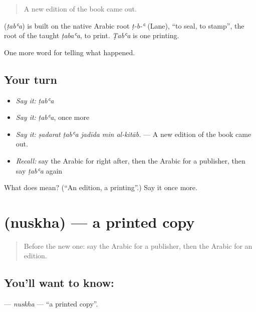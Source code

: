\begin{quote}
A new edition of the book came out.
\end{quote}

\begin{cousinweb}
\textbf{} (\emph{ṭabʿa}) is built on the native Arabic root \emph{ṭ-b-ʿ} (Lane), \textquotedblleft{}to seal, to stamp\textquotedblright{}, the root of the taught \emph{ṭabaʿa}, to print. \emph{Ṭabʿa} is one printing.
\end{cousinweb}

\begin{grammarlens}[title={What you've built}]
One more word for telling what happened.
\end{grammarlens}

\subsection*{Your turn}
\begin{itemize}
\raggedright
  \item \emph{Say it:} \emph{ṭabʿa}
  \item \emph{Say it:} \emph{ṭabʿa}, once more
  \item \emph{Say it:} \emph{ṣadarat ṭabʿa jadīda min al-kitāb.} — A new edition of the book came out.
  \item \emph{Recall:} say the Arabic for right after, then the Arabic for a publisher, then say \emph{ṭabʿa} again
\end{itemize}

\begin{tcolorbox}[breakable,colback=teal!4,colframe=teal!35!black,title={Before you move on}]
What does  mean? (\textquotedblleft{}An edition, a printing\textquotedblright{}.) Say it once more.
\end{tcolorbox}
\section[\texorpdfstring{\ar{نسخة} (nuskha)}{نسخة (nuskha)}]{ (nuskha) — a printed copy}

\label{lesson:AR-C350-nuskha}



\begin{quote}
Before the new one: say the Arabic for a publisher, then the Arabic for an edition.
\end{quote}

\subsection*{You'll want to know: }
\textbf{} — \emph{nuskha} — \textquotedblleft{}a printed copy\textquotedblright{}.

